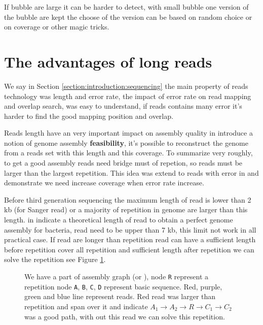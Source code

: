 \documentclass[main]{subfiles}
\begin{document}
If bubble are large it can be harder to detect, with small bubble one version of the bubble are kept the choose of the version can be based on random choice or on coverage or other magic tricks.

\section{The advantages of long reads}

We say in Section \ref{section:introduction:sequencing} the main property of reads technology was length and error rate, the impact of error rate on read mapping and overlap search, was easy to understand, if reads contains many error it's harder to find the good mapping position and overlap.

Reads length have an very important impact on assembly quality \citeauthor{Bresler_Tse} in \cite{Bresler_Tse} introduce a notion of genome assembly \textbf{feasibility}, it's possible to reconstruct the genome from a reads set with this length and this coverage. To summarize very roughly, to get a good assembly reads need bridge must of repetion, so reads must be larger than the largest repetition. This idea was extend to reads with error in \cite{feasibility_with_error} and demonstrate we need increase coverage when error rate increase.

Before third generation sequencing the maximum length of read is lower than 2 kb (for Sanger read) or a majority of repetition in genome are larger than this length. \citeauthor{one_chromosome_one_contig} in \cite{one_chromosome_one_contig} indicate a theoretical length of read to obtain a perfect genome assembly for bacteria, read need to be upper than 7 kb, this limit not work in all practical case. If read are longer than repetition read can have a sufficient length before repetition cover all repetition and sufficient length after repetition we can solve the repetition see Figure \ref{intro:fig:whylongreads}.

\begin{figure}[ht]
    \centering
    
    \caption{We have a part of assembly graph (\OLC or \DBG), node \texttt{R} represent a repetition node \texttt{A}, \texttt{B}, \texttt{C}, \texttt{D} represent basic sequence. Red, purple, green and blue line represent reads. Red read was larger than repetition and span over it and indicate $A_1 \rightarrow A_2 \rightarrow R \rightarrow C_1 \rightarrow C_2$ was a good path, with out this read we can solve this repetition.}
    \label{intro:fig:whylongreads}
\end{figure}
\end{document}
